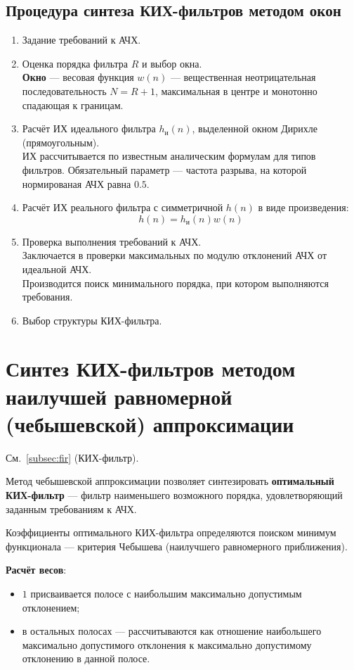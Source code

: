 \documentclass[a4paper, 14pt]{extarticle}
\begin{document}
\subsection{Процедура синтеза КИХ-фильтров методом окон}
\begin{enumerate}
    \item Задание требований к АЧХ.
    \item Оценка порядка фильтра $R$ и выбор окна.\\
        \textbf{Окно} --- весовая функция $w(n)$ --- вещественная неотрицательная последовательность $N=R+1$, максимальная в центре и монотонно спадающая к границам.
    \item Расчёт ИХ идеального фильтра $h_\text{и}(n)$, выделенной окном Дирихле (прямоугольным).\\
        ИХ рассчитывается по известным аналическим формулам для типов фильтров. Обязательный параметр --- частота разрыва, на которой нормированая АЧХ равна $0.5$.
    \item Расчёт ИХ реального фильтра с симметричной $h(n)$ в виде произведения:
        \begin{equation}
            h(n) = h_\text{и}(n)w(n)
        \end{equation}
    \item Проверка выполнения требований к АЧХ.\\
        Заключается в проверки максимальных по модулю отклонений АЧХ от идеальной АЧХ.\\
        Производится поиск минимального порядка, при котором выполняются требования.
    \item Выбор структуры КИХ-фильтра.
\end{enumerate}

\section{Синтез КИХ-фильтров методом наилучшей равномерной (чебышевской) аппроксимации}
См.~\ref{subsec:fir} (КИХ-фильтр).

Метод чебышевской аппроксимации позволяет синтезировать \textbf{оптимальный КИХ-фильтр} --- фильтр наименьшего возможного порядка, удовлетворяющий заданным требованиям к АЧХ.

Коэффициенты оптимального КИХ-фильтра определяются поиском минимум функционала --- критерия Чебышева (наилучшего равномерного приближения).

\textbf{Расчёт весов}:
\begin{itemize}
    \item $1$ присваивается полосе с наибольшим максимально допустимым отклонением;
    \item в остальных полосах --- рассчитываются как отношение наибольшего максимально допустимого отклонения к максимально допустимому отклонению в данной полосе.
\end{itemize}
\end{document}
